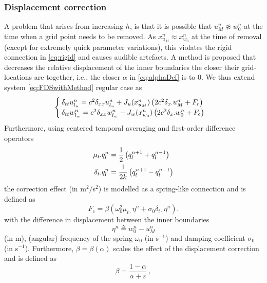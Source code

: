 \subsubsection{Displacement correction}\label{sec:dispCorr}
A problem that arises from increasing $h$, is that it is possible that $u_M^n \not\approx w_0^n$ at the time when a grid point needs to be removed. As $x_{u_M}^n \approx x_{w_0}^n$ at the time of removal (except for extremely quick parameter variations), this violates the rigid connection in \eqref{eq:rigid} and causes audible artefacts. A method is proposed that decreases the relative displacement of the inner boundaries the closer their grid-locations are together, i.e., the closer $\alpha$ in \eqref{eq:alphaDef} is to 0. We thus extend system \eqref{eq:FDSwithMethod} regular case as
\begin{equation}\label{eq:sysDispCorr}
\begin{cases}
    \delta_{tt}u_{l_u}^n = c^2\delta_{xx}u_{l_u}^n+ J_u(x_{u_M}^n)\left(2c^2\delta_{x\cdot}u_M^n + F_\text{c}\right)\\
    \delta_{tt}w_{l_w}^n = c^2\delta_{xx}w_{l_w}^n - J_w(x_{w_0}^n)\left(2c^2\delta_{x\cdot}w_0^n+F_\text{c}\right)
\end{cases}
\end{equation}
Furthermore, using centered temporal averaging and first-order difference operators
\begin{align}\label{eq:centeredAverage}
    \mu_{t\cdot}q_l^n &= \frac{1}{2} \left(q_l^{n+1} + q_l^{n-1}\right)\\
    \delta_{t\cdot}q_l^n &= \frac{1}{2k} \left(q_l^{n+1} - q_l^{n-1}\right)
\end{align}
the correction effect (in m$^2/$s$^2$) is modelled as a spring-like connection and is defined as
\begin{equation}\label{eq:dispCorrForce}
    F_\text{c} = \beta \left(\omega_0^2\mu_{t\cdot}\eta^n +\sigma_0\delta_{t\cdot}\eta^n \right).
\end{equation}
with the difference in displacement between the inner boundaries
\begin{equation}
    \eta^n \triangleq w_0^n - u_M^n 
\end{equation}
(in m), (angular) frequency of the spring $\omega_0$ (in s$^{-1}$) and damping coefficient $\sigma_0$ (in s$^{-1}$). Furthermore, $\beta = \beta(\alpha)$ scales the effect of the displacement correction and is defined as
\begin{equation}\label{eq:betaDef}
    \beta = \frac{1-\alpha}{\alpha + \varepsilon}\ ,
\end{equation}
